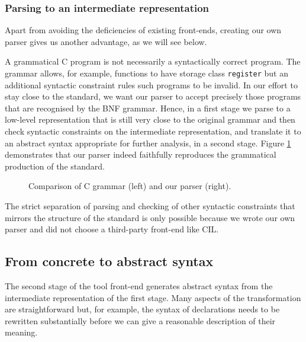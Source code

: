 \documentclass[a4paper,12pt]{scrbook}
\theoremstyle{plain}
\theoremstyle{definition}
\newcommand{\name}[1]{\textsf{#1}}
\begin{document}
\subsubsection{Parsing to an intermediate representation}
Apart from avoiding the deficiencies of existing front-ends, creating our own
parser gives us another advantage, as we will see below.

A grammatical C program is not necessarily a syntactically correct program. The
grammar allows, for example, functions to have storage class
\lstinline{register} but an additional syntactic constraint rules such programs
to be invalid. In our effort to stay close to the standard, we want our parser
to accept precisely those programs that are recognised by the BNF
grammar. Hence, in a first stage we parse to a low-level representation that is
still very close to the original grammar and then check syntactic constraints on
the intermediate representation, and translate it to an abstract syntax
appropriate for further analysis, in a second stage. Figure
\ref{grammarComparison} demonstrates that our parser indeed faithfully
reproduces the grammatical production of the standard.
\begin{figure}[hbt]
\centering
\subfloat{
\texttt{[image: n1539]}
}
\caption{Comparison of C grammar (left) and our parser (right).}
\label{grammarComparison}
\end{figure}

The strict separation of parsing and checking of other syntactic constraints
that mirrors the structure of the standard is only possible because we wrote our
own parser and did not choose a third-party front-end like \name{CIL}.

\subsection{From concrete to abstract syntax}\label{intermediateLanguage}
The second stage of the tool front-end generates abstract syntax from the
intermediate representation of the first stage. Many aspects of the
transformation are straightforward but, for example, the syntax of declarations
needs to be rewritten substantially before we can give a reasonable description
of their meaning.
\end{document}
